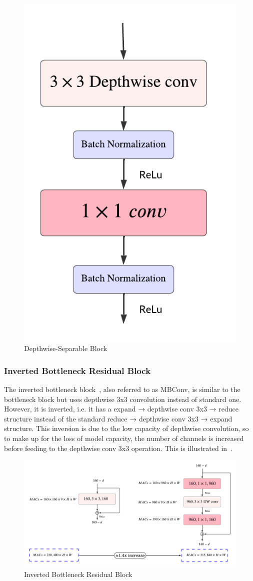            \begin{figure}[hbt!]
                \begin{center}
                \includegraphics[width=.3\textwidth]{assets/images/depthwise_sep.png}
                \end{center}
                \caption{Depthwise-Separable Block}%
                \label{fig:hw-nas:dl:dwsep}
            \end{figure}
                    
            
        \subsubsection{Inverted Bottleneck Residual Block}
            The inverted bottleneck block~\cite{mobilenetv2}, also referred to as MBConv, is similar to the bottleneck block but uses depthwise 3x3 convolution instead of standard one. However, it is inverted, i.e. it has a expand → depthwise conv 3x3 → reduce structure instead of the standard reduce → depthwise conv 3x3 → expand structure.  This inversion is due to the low capacity of depthwise convolution, so to make up for the loss of model capacity, the number of channels is increased before feeding to the depthwise conv 3x3 operation. This is illustrated in~.

            \begin{figure}[hbt!]
                \begin{center}
                \includegraphics[width=.8\textwidth]{assets/images/inverted.png}
                \end{center}
                \caption{Inverted Bottleneck Residual Block}%
                \label{fig:hw-nas:dl:inverted}
            \end{figure}
            
